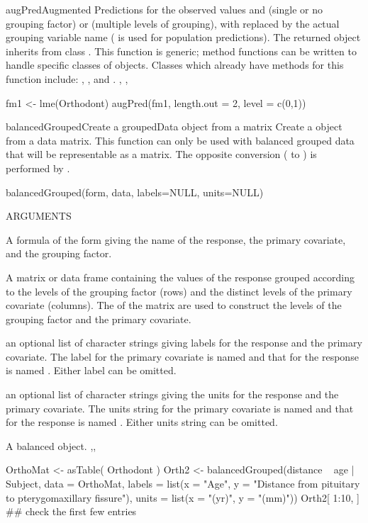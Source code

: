 \documentclass[pdftex]{article} \usepackage{url,graphicx}
\renewcommand{\Twiddle}{\mbox{\(\sim\)}}
\begin{document}
\begin{Helpfile}{augPred}{Augmented Predictions}
 for the observed values and  (single
or no grouping factor) or  (multiple levels of
grouping), with  replaced by the actual grouping
variable name ( is used for population predictions). The
returned object inherits from class .
 This function is generic; method functions can be written to handle
specific classes of objects. Classes which already have methods for
this function include: , , and .
, ,
\need 15pt
\vspace{-16pt} 
\begin{Example}
fm1 <- lme(Orthodont)
augPred(fm1, length.out = 2, level = c(0,1))
\end{Example}
\end{Helpfile}
\begin{Helpfile}{balancedGrouped}{Create a groupedData object from a matrix}
Create a  object from a data matrix.  This function
can only be used with balanced grouped data that will be representable
as a matrix.  The opposite conversion ( to
) is performed by .
\begin{Example}
balancedGrouped(form, data, labels=NULL, units=NULL)
\end{Example}
\begin{Argument}{ARGUMENTS}
\item[\Co{form:}]
A formula of the form \Co{y {\Twiddle} x | g} giving the name of
the response, the primary covariate, and the grouping factor.
\item[\Co{data:}]
A matrix or data frame containing the values of the
response grouped according to the levels of the grouping factor
(rows) and the distinct levels of the primary covariate (columns).
The  of the matrix are used to construct the levels of
the grouping factor and the primary covariate.
\item[\Co{labels:}]
an optional list of character strings giving labels for
the response and the primary covariate.  The label for the primary
covariate is named  and that for the response is named
.  Either label can be omitted.
\item[\Co{units:}]
an optional list of character strings giving the units for
the response and the primary covariate.  The units string for the
primary covariate is named  and that for the response is
named .  Either units string can be omitted.
\end{Argument}
A balanced  object.
,,
\need 15pt
\vspace{-16pt} 
\begin{Example}
OrthoMat <- asTable( Orthodont )
Orth2 <- balancedGrouped(distance ~ age | Subject, data = OrthoMat,
    labels = list(x = "Age",
       y = "Distance from pituitary to pterygomaxillary fissure"),
    units = list(x = "(yr)", y = "(mm)"))
Orth2[ 1:10, ]        ## check the first few entries
\end{Example}
\end{Helpfile}
\end{document}
